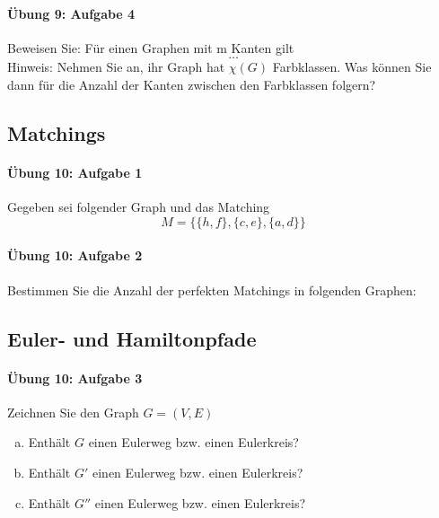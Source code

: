 \documentclass
[
  draft    = true,
  fontsize = 11pt,
  parskip  = half-,
  BCOR     = 0pt,
  DIV      = 11,
  ngerman,
  dvipsnames
]
{scrartcl}
\begin{document}
\paragraph{Übung 9: Aufgabe 4}
Beweisen Sie: Für einen Graphen mit m Kanten gilt
\begin{equation*}
  \ldots
\end{equation*}
Hinweis: Nehmen Sie an, ihr Graph hat $\chi(G)$ Farbklassen. Was können
Sie dann für die Anzahl der Kanten zwischen den Farbklassen folgern?

\subsection{Matchings}

\paragraph{Übung 10: Aufgabe 1}
Gegeben sei folgender Graph und das Matching
\begin{equation*}
  M=\{\{h,f\},\{c,e\},\{a,d\}\}
\end{equation*}

\paragraph{Übung 10: Aufgabe 2}
Bestimmen Sie die Anzahl der perfekten Matchings in folgenden Graphen:

\subsection{Euler- und Hamiltonpfade}

\paragraph{Übung 10: Aufgabe 3}
Zeichnen Sie den Graph $G=(V,E)$
\begin{enumerate}[a)]
  \item Enthält $G$ einen Eulerweg bzw. einen Eulerkreis?
  \item Enthält $G'$ einen Eulerweg bzw. einen Eulerkreis?
  \item Enthält $G''$ einen Eulerweg bzw. einen Eulerkreis?
\end{enumerate}
\end{document}
